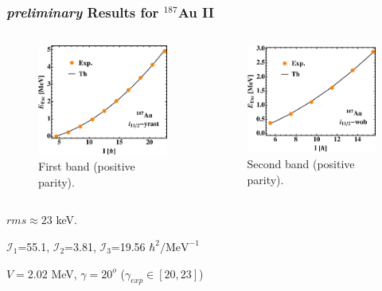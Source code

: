 \documentclass{beamer}
\begin{document}
\begin{frame}
    \frametitle{{\tiny \emph{preliminary}} Results for $^{187}$Au II}
    \begin{columns}[c] 
     \begin{figure}
         \centering
         \includegraphics[scale=0.4]{figs/Au_187_1.pdf}
         \caption{First band (positive parity).}
     \end{figure}
     \begin{figure}
         \centering
         \includegraphics[scale=0.4]{figs/Au_187_2.pdf}
         \caption{Second band (positive parity).}
     \end{figure}
    \end{columns}
    \par $rms\approx23$ keV.
    \par $\mathcal{I}_1$=55.1, $\mathcal{I}_2$=3.81, $\mathcal{I}_3$=19.56 $\hbar^2/\text{MeV}^{-1}$
    \par $V=2.02$ MeV, $\gamma=20^o$ ($\gamma_{exp}\in[20,23]$)
\end{frame}
\end{document}
